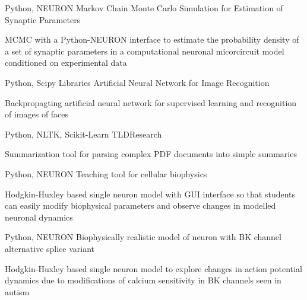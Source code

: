 


\begin{cventries}





\cventry
{Python, NEURON} %
{Markov Chain Monte Carlo Simulation for Estimation of Synaptic Parameters} %
{} %
{} %
{ %
\begin{cvitems}
\item {MCMC with a Python-NEURON interface to estimate the probability density of a set of synaptic parameters in a computational neuronal micorcircuit model conditioned on experimental data}
\end{cvitems}
}
\cventry
{Python, Scipy Libraries} %
{Artificial Neural Network for Image Recognition} %
{} %
{} %
{ %
\begin{cvitems}
\item {Backpropagting artificial neural network for supervised learning and recognition of images of faces}
\end{cvitems}
}
\cventry
{Python, NLTK, Scikit-Learn} %
{TLDResearch} %
{} %
{} %
{ %
\begin{cvitems}
\item {Summarization tool for parsing complex PDF documents into simple summaries}
\end{cvitems}
}
\cventry
{Python, NEURON} %
{Teaching tool for cellular biophysics} %
{} %
{} %
{ %
\begin{cvitems}
\item {Hodgkin-Huxley based single neuron model with GUI interface so that students can easily modify biophysical parameters and observe changes in modelled neuronal dynamics}
\end{cvitems}
}
\cventry
{Python, NEURON} %
{Biophysically realistic model of neuron with BK channel alternative splice variant} %
{} %
{} %
{ %
\begin{cvitems}
\item {Hodgkin-Huxley based single neuron model to explore changes in action potential dynamics due to modifications of calcium sensitivity in BK channels seen in autism}
\end{cvitems}
}


\end{cventries}
